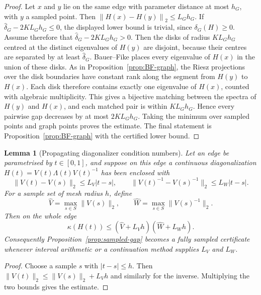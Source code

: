 \documentclass[11pt]{article}
\newtheorem{lemma}[theorem]{Lemma}
\numberwithin{equation}{section}
\newcommand{\norm}[1]{\left\|#1\right\|}
\begin{document}
\begin{proof}
Let \(x\) and \(y\) lie on the same edge with parameter distance at most
\(h_G\), with \(y\) a sampled point.  Then
\(\norm{H(x)-H(y)}_2\le L_Gh_G\).  If
\(\widehat\delta_G-2KL_Gh_G\le0\), the displayed lower bound is trivial,
since \(\delta_G(H)\ge0\).  Assume therefore that
\(\widehat\delta_G-2KL_Gh_G>0\).  Then the disks of radius \(KL_Gh_G\)
centred at the distinct eigenvalues of \(H(y)\) are disjoint, because their
centres are separated by at least \(\widehat\delta_G\).  Bauer--Fike places
every eigenvalue of \(H(x)\) in the union of these disks.  As in
Proposition~\ref{prop:BF-graph}, the Riesz projections over the disk
boundaries have constant rank along the segment from \(H(y)\) to \(H(x)\).
Each disk therefore contains exactly one eigenvalue of \(H(x)\), counted with
algebraic multiplicity.  This gives
a bijective matching between the spectra of \(H(y)\) and \(H(x)\), and each
matched pair is within \(KL_Gh_G\).  Hence every pairwise gap decreases by
at most \(2KL_Gh_G\).  Taking the minimum over sampled points and graph
points proves the estimate.  The final statement is
Proposition~\ref{prop:BF-graph} with the certified lower bound.
\end{proof}


\begin{lemma}[Propagating diagonalizer condition numbers]\label{lem:kappa-propagation}
Let an edge be parametrised by \(t\in[0,1]\), and suppose on this edge a
continuous diagonalization
\(H(t)=V(t)\Lambda(t)V(t)^{-1}\) has been enclosed with
\[
  \|V(t)-V(s)\|_2\le L_V|t-s|,
  \qquad
  \|V(t)^{-1}-V(s)^{-1}\|_2\le L_W|t-s|.
\]
For a sample set of mesh radius \(h\), define
\[
  \widehat V=\max_{s\in S}\|V(s)\|_2,
  \qquad
  \widehat W=\max_{s\in S}\|V(s)^{-1}\|_2 .
\]
Then on the whole edge
\[
  \kappa(H(t))\le (\widehat V+L_Vh)(\widehat W+L_Wh).
\]
Consequently Proposition~\ref{prop:sampled-gap} becomes a fully sampled
certificate whenever interval arithmetic or a continuation method supplies
\(L_V\) and \(L_W\).
\end{lemma}

\begin{proof}
Choose a sample \(s\) with \(|t-s|\le h\).  Then
\(\|V(t)\|_2\le\|V(s)\|_2+L_Vh\) and similarly for the inverse.  Multiplying
the two bounds gives the estimate.
\end{proof}
\end{document}
